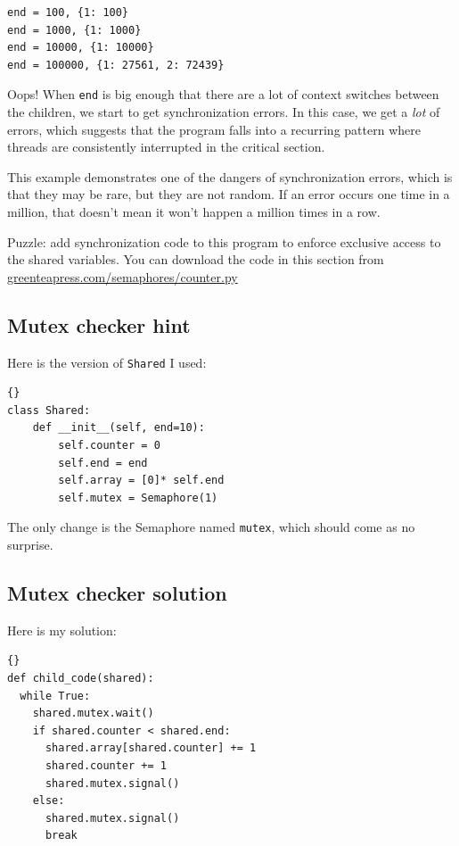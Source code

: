 \documentclass{book}
\begin{document}
\begin{verbatim}
end = 100, {1: 100}
end = 1000, {1: 1000}
end = 10000, {1: 10000}
end = 100000, {1: 27561, 2: 72439}
\end{verbatim}
%
Oops!  When {\tt end} is big enough that there are a lot of
context switches between the children, we start to get synchronization
errors.  In this case, we get a {\em lot} of errors, which suggests
that the program falls into a recurring pattern where threads are
consistently interrupted in the critical section.

This example demonstrates one of the dangers of synchronization
errors, which is that they may be rare, but they are not random.
If an error occurs one time in a million, that doesn't mean it
won't happen a million times in a row.

Puzzle: add synchronization code to this program to enforce
exclusive access to the shared variables.  You can download the
code in this section from \url{greenteapress.com/semaphores/counter.py}



\subsection {Mutex checker hint}

Here is the version of {\tt Shared} I used:

\begin{lstlisting}[title={}]{}
class Shared:
    def __init__(self, end=10):
        self.counter = 0
        self.end = end
        self.array = [0]* self.end
        self.mutex = Semaphore(1)
\end{lstlisting}

The only change is the Semaphore named {\tt mutex}, which should
come as no surprise.


\subsection {Mutex checker solution}

Here is my solution:

\begin{lstlisting}[title={}]{}
def child_code(shared):
  while True:
    shared.mutex.wait()
    if shared.counter < shared.end:
      shared.array[shared.counter] += 1
      shared.counter += 1
      shared.mutex.signal()
    else:
      shared.mutex.signal()
      break
\end{lstlisting}
\end{document}
